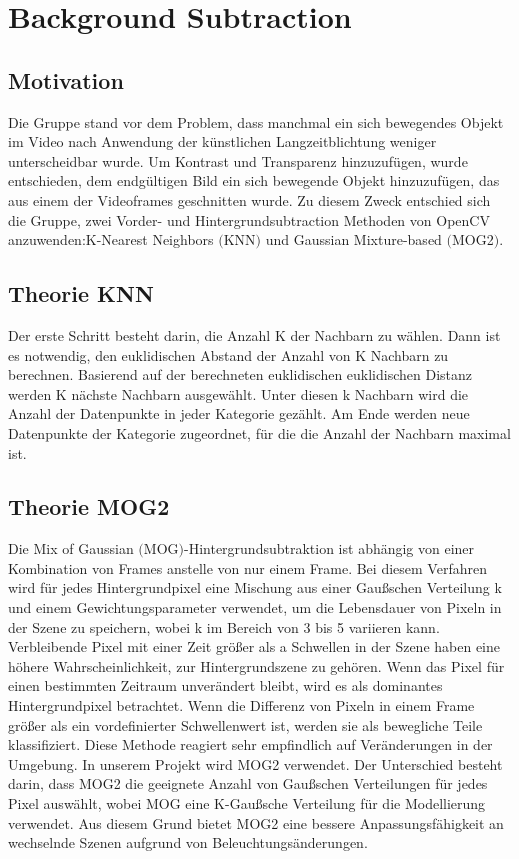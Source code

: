 \documentclass[12pt]{scrartcl}
\begin{document}
\section{Background Subtraction}
\subsection{Motivation}
Die Gruppe stand vor dem Problem, dass manchmal ein sich bewegendes Objekt im Video nach Anwendung der k\"unstlichen Langzeitblichtung weniger unterscheidbar wurde. Um Kontrast und Transparenz hinzuzuf\"ugen, wurde entschieden, dem endg\"ultigen Bild ein sich bewegende Objekt hinzuzuf\"ugen, das aus einem der Videoframes geschnitten wurde.
Zu diesem Zweck entschied sich die Gruppe, zwei Vorder- und Hintergrundsubtraction Methoden von OpenCV anzuwenden:K-Nearest Neighbors $($KNN$)$ und Gaussian Mixture-based $($MOG2$)$.\\
\subsection{Theorie KNN}
Der erste Schritt besteht darin, die Anzahl K der Nachbarn zu w\"ahlen. Dann ist es notwendig, den euklidischen Abstand der Anzahl von K Nachbarn zu berechnen. Basierend auf der berechneten euklidischen euklidischen Distanz werden K n\"achste Nachbarn ausgew\"ahlt. Unter diesen k Nachbarn wird die Anzahl der Datenpunkte in jeder Kategorie gez\"ahlt.
Am Ende werden neue Datenpunkte der Kategorie zugeordnet, f\"ur die die Anzahl der Nachbarn maximal ist.
\subsection{Theorie MOG2}
Die Mix of Gaussian $($MOG$)$-Hintergrundsubtraktion ist abh\"angig von einer Kombination von Frames anstelle von nur einem Frame. Bei diesem Verfahren wird f\"ur jedes Hintergrundpixel eine Mischung aus einer Gau{\ss}schen Verteilung k und einem Gewichtungsparameter verwendet, um die Lebensdauer von Pixeln in der Szene zu speichern, wobei k im Bereich von 3 bis 5 variieren kann. Verbleibende Pixel mit einer Zeit gr\"o{\ss}er als a Schwellen in der Szene haben eine h\"ohere Wahrscheinlichkeit, zur Hintergrundszene zu geh\"oren. Wenn das Pixel f\"ur einen bestimmten Zeitraum unver\"andert bleibt, wird es als dominantes Hintergrundpixel betrachtet. Wenn die Differenz von Pixeln in einem Frame gr\"o{\ss}er als ein vordefinierter Schwellenwert ist, werden sie als bewegliche Teile klassifiziert. Diese Methode reagiert sehr empfindlich auf Ver\"anderungen in der Umgebung.
In unserem Projekt wird MOG2 verwendet. Der Unterschied besteht darin, dass MOG2 die geeignete Anzahl von Gau{\ss}schen Verteilungen f\"ur jedes Pixel ausw\"ahlt, wobei MOG eine K-Gau{\ss}sche Verteilung f\"ur die Modellierung verwendet. Aus diesem Grund bietet MOG2 eine bessere Anpassungsf\"ahigkeit an wechselnde Szenen aufgrund von Beleuchtungs\"anderungen.
\end{document}

